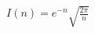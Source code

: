 \documentclass[preview]{standalone}
\begin{document}
\begin{align*}
I(n)=e^{-n} \sqrt{\frac{2\pi}{n}}
\end{align*}
\end{document}
